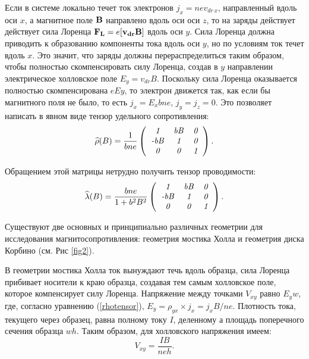 Если в системе локально течет ток электронов $j_x=nev_{dr\, x}$, направленный вдоль оси $x$, а магнитное поле ${\bf B}$ направлено вдоль оси оси $z$, то на заряды действует действует сила Лоренца ${\bf F_{L}}=e[{\bf v_{dr}B]}$ вдоль оси $y$.
Сила Лоренца должна приводить к образованию компоненты тока вдоль оси $y$, но по условиям ток течет вдоль $x$. Это значит, что заряды должны перераспределиться таким образом, чтобы полностью скомпенсировать силу
Лоренца, создав в $y$ направлении электрическое холловское поле $E_y=v_{dr}B$. Поскольку сила Лоренца
оказывается полностью скомпенсирована $eEy$, то электрон движется так, как если бы магнитного поля не
было, то есть $j_x=E_xbne$, $j_y=j_z=0$. Это позволяет написать в явном виде тензор удельного сопротивления:
\begin{equation}
\widehat{\rho}(B)=\frac{1}{bne}\left(
\begin{tabular}{ccc}
{\it 1} & {\it bB} & {\it 0} \\
{\it -bB} &{\it 1}& {\it 0} \\
{\it 0} &{\it 0}& {\it 1}\\
\end{tabular}
\right).
\label{rhotensor}
\end{equation}

Обращением этой матрицы нетрудно получить тензор проводимости:
\begin{equation}
\widehat{\lambda}(B)=\frac{bne}{1+b^2B^2}\left(
\begin{tabular}{ccc}
{\it 1} & {\it bB} & {\it 0} \\
{\it -bB} &{\it 1}& {\it 0} \\
{\it 0} &{\it 0}& {\it 1}\\
\end{tabular}
\right).
\label{lambdatensor}
\end{equation}

Существуют две основных и принципиально различных геометрии для исследования магнитосопротивления: геометрия
мостика Холла и геометрия диска Корбино (см. Рис \ref{fig2}).

В геометрии мостика Холла ток вынуждают течь вдоль образца, сила Лоренца прибивает носители к краю образца, создавая тем самым холловское поле, которое компенсирует силу Лоренца. Напряжение между точками $V_{xy}$ равно $E_yw$, где, согласно уравнению (\ref{rhotensor}), $E_y=\rho_{yx}\times j_x=j_x B/ne$. Плотность тока, текущего через образец, равна полному току $I$, деленному а площадь поперечного сечения образца $wh$. Таким образом, для холловского напряжения имеем:
\begin{equation}
V_{xy}=\frac{IB}{neh}.
\label{HallVoltage}
\end{equation}


